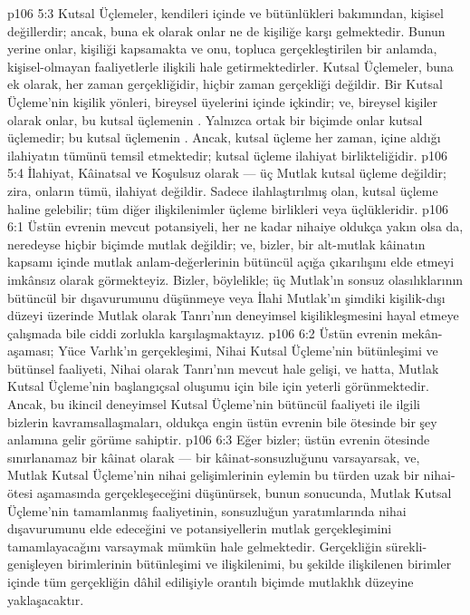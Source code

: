 \vs p106 5:3 Kutsal Üçlemeler, kendileri içinde ve bütünlükleri bakımından, kişisel değillerdir; ancak, buna ek olarak onlar ne de kişiliğe karşı gelmektedir. Bunun yerine onlar, kişiliği kapsamakta ve onu, topluca gerçekleştirilen bir anlamda, kişisel\hyp{}olmayan faaliyetlerle ilişkili hale getirmektedirler. Kutsal Üçlemeler, buna ek olarak, her zaman  gerçekliğidir, hiçbir zaman  gerçekliği değildir. Bir Kutsal Üçleme’nin kişilik yönleri, bireysel üyelerini içinde içkindir; ve, bireysel kişiler olarak onlar, bu kutsal üçlemenin . Yalnızca ortak bir biçimde onlar kutsal üçlemedir; bu kutsal üçlemenin . Ancak, kutsal üçleme her zaman, içine aldığı ilahiyatın tümünü temsil etmektedir; kutsal üçleme ilahiyat birlikteliğidir.
\vs p106 5:4 İlahiyat, Kâinatsal ve Koşulsuz olarak --- üç Mutlak kutsal üçleme değildir; zira, onların tümü, ilahiyat değildir. Sadece ilahlaştırılmış olan, kutsal üçleme haline gelebilir; tüm diğer ilişkilenimler üçleme birlikleri veya üçlükleridir.
\vs p106 6:1 Üstün evrenin mevcut potansiyeli, her ne kadar nihaiye oldukça yakın olsa da, neredeyse hiçbir biçimde mutlak değildir; ve, bizler, bir alt\hyp{}mutlak kâinatın kapsamı içinde mutlak anlam\hyp{}değerlerinin bütüncül açığa çıkarılışını elde etmeyi imkânsız olarak görmekteyiz. Bizler, böylelikle; üç Mutlak’ın sonsuz olasılıklarının bütüncül bir dışavurumunu düşünmeye veya İlahi Mutlak’ın şimdiki kişilik\hyp{}dışı düzeyi üzerinde Mutlak olarak Tanrı’nın deneyimsel kişilikleşmesini hayal etmeye çalışmada bile ciddi zorlukla karşılaşmaktayız.
\vs p106 6:2 Üstün evrenin mekân\hyp{}aşaması; Yüce Varlık’ın gerçekleşimi, Nihai Kutsal Üçleme’nin bütünleşimi ve bütünsel faaliyeti, Nihai olarak Tanrı’nın mevcut hale gelişi, ve hatta, Mutlak Kutsal Üçleme’nin başlangıçsal oluşumu için bile için yeterli görünmektedir. Ancak, bu ikincil deneyimsel Kutsal Üçleme’nin bütüncül faaliyeti ile ilgili bizlerin kavramsallaşmaları, oldukça engin üstün evrenin bile ötesinde bir şey anlamına gelir görüme sahiptir.
\vs p106 6:3 Eğer bizler; üstün evrenin ötesinde sınırlanamaz bir kâinat olarak --- bir kâinat\hyp{}sonsuzluğunu varsayarsak, ve, Mutlak Kutsal Üçleme’nin nihai gelişimlerinin eylemin bu türden uzak bir nihai\hyp{}ötesi aşamasında gerçekleşeceğini düşünürsek, bunun sonucunda, Mutlak Kutsal Üçleme’nin tamamlanmış faaliyetinin, sonsuzluğun yaratımlarında nihai dışavurumunu elde edeceğini ve  potansiyellerin mutlak gerçekleşimini tamamlayacağını varsaymak mümkün hale gelmektedir. Gerçekliğin sürekli\hyp{}genişleyen birimlerinin bütünleşimi ve ilişkilenimi, bu şekilde ilişkilenen birimler içinde tüm gerçekliğin dâhil edilişiyle orantılı biçimde mutlaklık düzeyine yaklaşacaktır.
